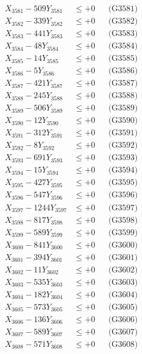 \documentclass[a4paper,10pt]{article}
\begin{document}
{\begin{align}
\allowbreak
X_{3581} - 509Y_{3581} &\leq +0 && \text{(G3581)} \\
X_{3582} - 339Y_{3582} &\leq +0 && \text{(G3582)} \\
X_{3583} - 441Y_{3583} &\leq +0 && \text{(G3583)} \\
X_{3584} - 48Y_{3584} &\leq +0 && \text{(G3584)} \\
X_{3585} - 14Y_{3585} &\leq +0 && \text{(G3585)} \\
X_{3586} - 5Y_{3586} &\leq +0 && \text{(G3586)} \\
X_{3587} - 421Y_{3587} &\leq +0 && \text{(G3587)} \\
X_{3588} - 245Y_{3588} &\leq +0 && \text{(G3588)} \\
X_{3589} - 506Y_{3589} &\leq +0 && \text{(G3589)} \\
X_{3590} - 12Y_{3590} &\leq +0 && \text{(G3590)} \\
\allowbreak
X_{3591} - 312Y_{3591} &\leq +0 && \text{(G3591)} \\
X_{3592} - 8Y_{3592} &\leq +0 && \text{(G3592)} \\
X_{3593} - 691Y_{3593} &\leq +0 && \text{(G3593)} \\
X_{3594} - 15Y_{3594} &\leq +0 && \text{(G3594)} \\
X_{3595} - 427Y_{3595} &\leq +0 && \text{(G3595)} \\
X_{3596} - 547Y_{3596} &\leq +0 && \text{(G3596)} \\
X_{3597} - 1244Y_{3597} &\leq +0 && \text{(G3597)} \\
X_{3598} - 817Y_{3598} &\leq +0 && \text{(G3598)} \\
X_{3599} - 589Y_{3599} &\leq +0 && \text{(G3599)} \\
X_{3600} - 841Y_{3600} &\leq +0 && \text{(G3600)} \\
\allowbreak
X_{3601} - 394Y_{3601} &\leq +0 && \text{(G3601)} \\
X_{3602} - 11Y_{3602} &\leq +0 && \text{(G3602)} \\
X_{3603} - 535Y_{3603} &\leq +0 && \text{(G3603)} \\
X_{3604} - 182Y_{3604} &\leq +0 && \text{(G3604)} \\
X_{3605} - 573Y_{3605} &\leq +0 && \text{(G3605)} \\
X_{3606} - 136Y_{3606} &\leq +0 && \text{(G3606)} \\
X_{3607} - 589Y_{3607} &\leq +0 && \text{(G3607)} \\
X_{3608} - 571Y_{3608} &\leq +0 && \text{(G3608)} \\

\end{align}}
\end{document}
